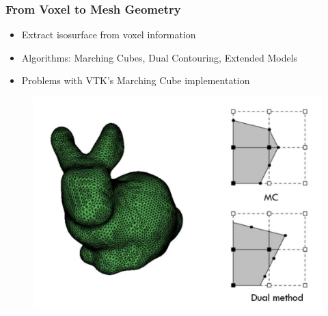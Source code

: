 \begin{frame}

	\frametitle{From Voxel to Mesh Geometry}
	
	\begin{itemize}
	\item Extract isosurface from voxel information
	\item Algorithms: Marching Cubes, Dual Contouring, Extended Models
	\item Problems with VTK's Marching Cube implementation
	\end{itemize}
	\begin{figure}
	\includegraphics[scale=0.35]{Pictures/bunny_MC.pdf}
	\end{figure}
	
\end{frame}

